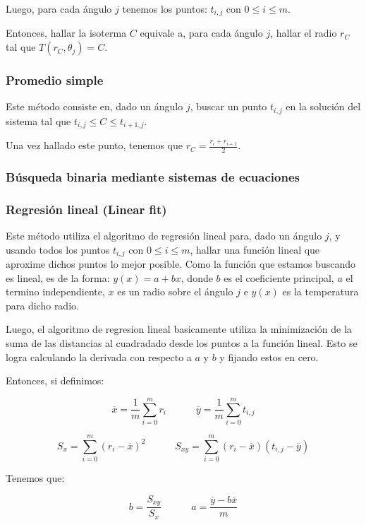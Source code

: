 Luego, para cada ángulo $j$ tenemos los puntos: $t_{i,j}$ con $0 \leq i \leq m$.

Entonces, hallar la isoterma $C$ equivale a, para cada ángulo $j$, hallar el radio $r_C$ tal que $T(r_C, \theta_j) = C$.

\subsubsection{Promedio simple}

Este método consiste en, dado un ángulo $j$, buscar un punto $t_{i,j}$ en la solución del sistema tal que $t_{i,j} \leq C \leq t_{i+1,j}$.

Una vez hallado este punto, tenemos que $r_C = \frac{r_i + r_{i+1}}{2}$.

\subsubsection{Búsqueda binaria mediante sistemas de ecuaciones}

\subsubsection{Regresión lineal (Linear fit)}

Este método utiliza el algoritmo de regresión lineal para, dado un ángulo $j$, y usando todos los puntos $t_{i,j}$ con $0 \leq i \leq m$, hallar una función lineal que aproxime dichos puntos lo mejor posible.
Como la función que estamos buscando es lineal, es de la forma: $y(x) = a + bx$, donde $b$ es el coeficiente principal, $a$ el termino independiente, $x$ es un radio sobre el ángulo $j$ e $y(x)$ es la temperatura para dicho radio.

Luego, el algoritmo de regresion lineal basicamente utiliza la minimización de la suma de las distancias al cuadradado desde los puntos a la función lineal. Esto se logra calculando la derivada con respecto a $a$ y $b$ y fijando estos en cero.

Entonces, si definimos:

$$\overline{x} = \frac{1}{m}\sum_{i=0}^{m}{r_i} \quad\quad\quad \overline{y} = \frac{1}{m}\sum_{i=0}^{m}{t_{i,j}}$$

$$S_x = \sum_{i=0}^{m}{(r_i - \overline{x})^2} \quad\quad\quad S_{xy} = \sum_{i=0}^{m}{(r_i - \overline{x})(t_{i,j} - \overline{y})}$$

Tenemos que:

$$b = \frac{S_{xy}}{S_x}  \quad\quad\quad a = \frac{\overline{y} - b\overline{x}}{m}$$

